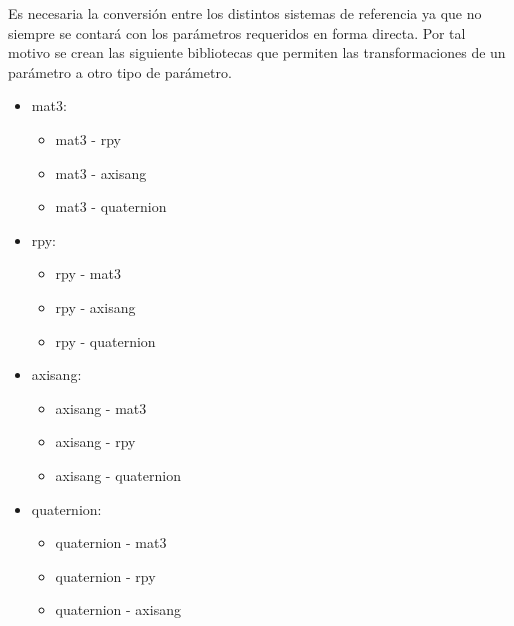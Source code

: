 \documentclass[../main.tex]{subfiles}
\begin{document}
Es necesaria la conversión entre los distintos sistemas
de referencia ya que no siempre se contará con los
parámetros requeridos en forma directa. Por tal motivo
se crean las siguiente bibliotecas que permiten las
transformaciones de un parámetro a otro tipo de parámetro.

\begin{itemize}
\item mat3:
  \begin{itemize}
  \item mat3 - rpy
  \item mat3 - axisang
  \item mat3 - quaternion
  \end{itemize}
\item rpy:
  \begin{itemize}
  \item rpy - mat3
  \item rpy - axisang
  \item rpy - quaternion
  \end{itemize}
\item axisang:
  \begin{itemize}
  \item axisang - mat3
  \item axisang - rpy
  \item axisang - quaternion
  \end{itemize}
\item quaternion:
  \begin{itemize}
  \item quaternion - mat3
  \item quaternion - rpy
  \item quaternion - axisang
  \end{itemize}
\end{itemize}
\end{document}
